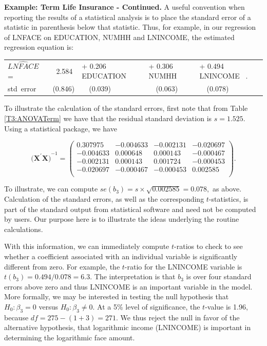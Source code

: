 \linejed

\textbf{Example: Term Life Insurance - Continued.} A useful
convention when reporting the results of a statistical analysis is
to place the standard error of a statistic in parenthesis below that
statistic. Thus, for example, in our regression of LNFACE on
EDUCATION, NUMHH and LNINCOME, the estimated regression equation is:

\begin{center}
\begin{tabular}{lllll}
$\widehat{LNFACE}$~ = & ~2.584 & + 0.206 EDUCATION & + 0.306 NUMHH &
+ 0.494 LNINCOME ~.\\
std~error &  (0.846) &  ~~(0.039)   &  ~~(0.063) &  ~~(0.078)  \\
\end{tabular}
\end{center}

To illustrate the calculation of the standard errors, first note
that from Table \ref{T3:ANOVATerm} we have that the residual
standard deviation is $s=1.525$. Using a statistical package, we
have

\begin{equation*}
(\mathbf{X^{\prime}X)}^{-1} = \left(
  \begin{array}{rrrr}
 0.307975 &  -0.004633 &  -0.002131 &  -0.020697 \\
 -0.004633 &   0.000648 &   0.000143 &  -0.000467 \\
-0.002131 &   0.000143 &   0.001724 &  -0.000453 \\
 -0.020697 &  -0.000467 &  -0.000453 &   0.002585 \\
  \end{array}
\right).
\end{equation*}


\noindent To illustrate, we can compute $se(b_3)=s \times \sqrt
{0.002585} = 0.078,$ as above. Calculation of the standard errors,
as well as the corresponding $t$-statistics, is part of the standard
output from statistical software and need not be computed by users.
Our purpose here is to illustrate the ideas underlying the routine
calculations.

With this information, we can immediately compute $t$-ratios to
check to see whether a coefficient associated with an individual
variable is significantly different from zero. For example, the
$t$-ratio for the LNINCOME variable is $t(b_3)=0.494/0.078=6.3$. The
interpretation is that $b_3$ is over four standard errors above zero
and thus LNINCOME is an important variable in the model. More
formally, we may be interested in testing the null hypothesis that
$H_0:\beta_3 = 0$ versus $H_0:\beta_3 \neq 0$. At a 5\% level of
significance, the $t$-value is 1.96, because $df=275-(1+3)=271$. We
thus reject the null in favor of the alternative hypothesis, that
logarithmic income (LNINCOME) is important in determining the
logarithmic face amount.

